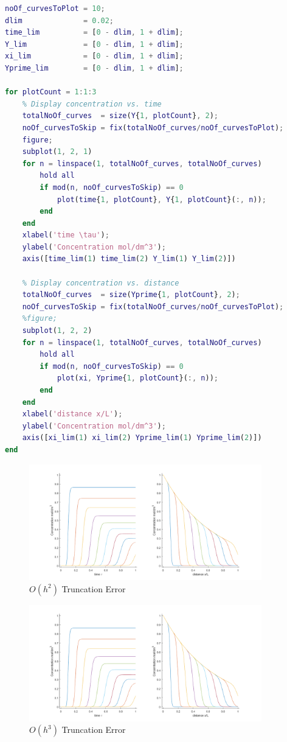 \documentclass{article}
\begin{document}
\begin{lstlisting}[language=Matlab, caption=Reactor : Plot the solutions, label=lis:plotTheSolutions]
% Plot limits
noOf_curvesToPlot = 10;
dlim              = 0.02;
time_lim          = [0 - dlim, 1 + dlim];
Y_lim             = [0 - dlim, 1 + dlim];
xi_lim            = [0 - dlim, 1 + dlim];
Yprime_lim        = [0 - dlim, 1 + dlim];

for plotCount = 1:1:3
    % Display concentration vs. time
    totalNoOf_curves  = size(Y{1, plotCount}, 2);
    noOf_curvesToSkip = fix(totalNoOf_curves/noOf_curvesToPlot);
    figure;
    subplot(1, 2, 1)
    for n = linspace(1, totalNoOf_curves, totalNoOf_curves)
        hold all
        if mod(n, noOf_curvesToSkip) == 0
            plot(time{1, plotCount}, Y{1, plotCount}(:, n));
        end
    end
    xlabel('time \tau');
    ylabel('Concentration mol/dm^3');
    axis([time_lim(1) time_lim(2) Y_lim(1) Y_lim(2)])

    % Display concentration vs. distance
    totalNoOf_curves  = size(Yprime{1, plotCount}, 2);
    noOf_curvesToSkip = fix(totalNoOf_curves/noOf_curvesToPlot);
    %figure;
    subplot(1, 2, 2)
    for n = linspace(1, totalNoOf_curves, totalNoOf_curves)
        hold all
        if mod(n, noOf_curvesToSkip) == 0
            plot(xi, Yprime{1, plotCount}(:, n));
        end
    end
    xlabel('distance x/L');
    ylabel('Concentration mol/dm^3');
    axis([xi_lim(1) xi_lim(2) Yprime_lim(1) Yprime_lim(2)])
end
\end{lstlisting}

\begin{figure}[h!]
	\centering
	\includegraphics[width=0.90\textwidth]{./matlab/Oh2_truncationError.png}
	\caption{$O(h^2)$ Truncation Error}
	\label{img:Oh2TruncationError}
\end{figure}

\begin{figure}[h!]
	\centering
	\includegraphics[width=0.90\textwidth]{./matlab/Oh3_truncationError.png}
	\caption{$O(h^3)$ Truncation Error}
	\label{img:Oh3TruncationError}
\end{figure}
\end{document}
